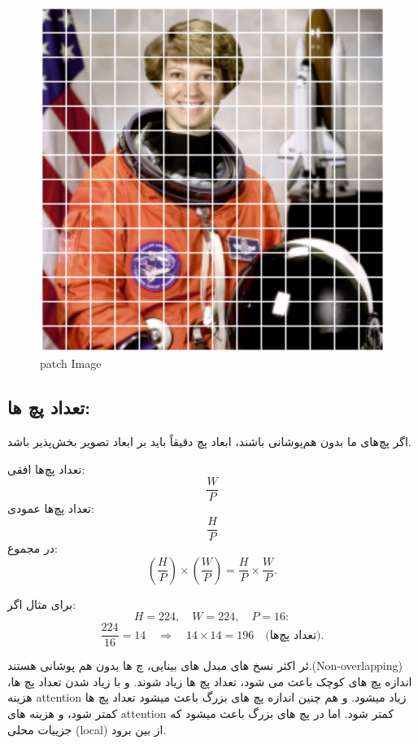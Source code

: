 \begin{figure}[h]
	\centering
	\begin{minipage}[b]{0.9\textwidth}
		\centering
		\includegraphics[width=\textwidth]{transformer_images/space_patch_iamge.png}
		\caption{patch Image}
		\label{fig:Patch Image}
	\end{minipage}
	\hfill
	
\end{figure}

\subsection{تعداد پچ ها:}

اگر پچ‌های ما بدون هم‌پوشانی باشند، ابعاد پچ دقیقاً باید بر ابعاد تصویر بخش‌پذیر باشد.


تعداد پچ‌ها افقی:
\[
\frac{W}{P}
\]
تعداد پچ‌ها عمودی:
\[
\frac{H}{P}
\]
در مجموع:
\[
\left(\frac{H}{P}\right) \times \left(\frac{W}{P}\right) = \frac{H}{P} \times \frac{W}{P}.
\]

برای مثال اگر:
\[
H = 224, \quad W = 224, \quad P = 16:
\]
\[
\frac{224}{16} = 14 \quad \Rightarrow \quad 14 \times 14 = 196 \quad \text{(تعداد پچ‌ها)}.
\]

ئر اکثر نسخ های مبدل های بینایی، چ ها بدون هم پوشانی هستند.(Non-overlapping)
اندازه پچ های کوچک باعث می شود، تعداد پچ ها زیاد شوند. و با زیاد شدن تعداد پچ ها، هزینه attention  زیاد میشود. و هم چنین اندازه پچ های بزرگ باعث میشود تعداد پچ ها کمتر شود، و هزینه های attention کمتر شود. اما در پچ های بزرگ باعث میشود که جزییات محلی (local) از بین برود.

